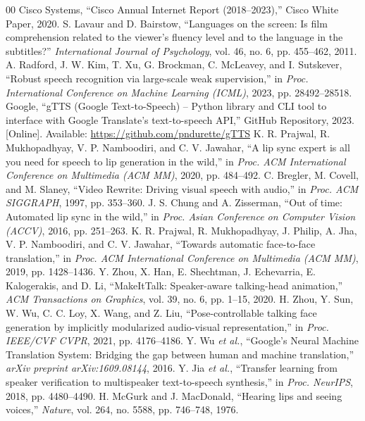 \documentclass[conference]{IEEEtran}
\begin{document}
\begin{thebibliography}{00}
 Cisco Systems, ``Cisco Annual Internet Report (2018--2023),'' Cisco White Paper, 2020.
 S. Lavaur and D. Bairstow, ``Languages on the screen: Is film comprehension related to the viewer's fluency level and to the language in the subtitles?'' \emph{International Journal of Psychology}, vol. 46, no. 6, pp. 455--462, 2011.
 A. Radford, J. W. Kim, T. Xu, G. Brockman, C. McLeavey, and I. Sutskever, ``Robust speech recognition via large-scale weak supervision,'' in \emph{Proc. International Conference on Machine Learning (ICML)}, 2023, pp. 28492--28518.
 Google, ``gTTS (Google Text-to-Speech) -- Python library and CLI tool to interface with Google Translate's text-to-speech API,'' GitHub Repository, 2023. [Online]. Available: \url{https://github.com/pndurette/gTTS}
 K. R. Prajwal, R. Mukhopadhyay, V. P. Namboodiri, and C. V. Jawahar, ``A lip sync expert is all you need for speech to lip generation in the wild,'' in \emph{Proc. ACM International Conference on Multimedia (ACM MM)}, 2020, pp. 484--492.
 C. Bregler, M. Covell, and M. Slaney, ``Video Rewrite: Driving visual speech with audio,'' in \emph{Proc. ACM SIGGRAPH}, 1997, pp. 353--360.
 J. S. Chung and A. Zisserman, ``Out of time: Automated lip sync in the wild,'' in \emph{Proc. Asian Conference on Computer Vision (ACCV)}, 2016, pp. 251--263.
 K. R. Prajwal, R. Mukhopadhyay, J. Philip, A. Jha, V. P. Namboodiri, and C. V. Jawahar, ``Towards automatic face-to-face translation,'' in \emph{Proc. ACM International Conference on Multimedia (ACM MM)}, 2019, pp. 1428--1436.
 Y. Zhou, X. Han, E. Shechtman, J. Echevarria, E. Kalogerakis, and D. Li, ``MakeItTalk: Speaker-aware talking-head animation,'' \emph{ACM Transactions on Graphics}, vol. 39, no. 6, pp. 1--15, 2020.
 H. Zhou, Y. Sun, W. Wu, C. C. Loy, X. Wang, and Z. Liu, ``Pose-controllable talking face generation by implicitly modularized audio-visual representation,'' in \emph{Proc. IEEE/CVF CVPR}, 2021, pp. 4176--4186.
 Y. Wu \emph{et al.}, ``Google's Neural Machine Translation System: Bridging the gap between human and machine translation,'' \emph{arXiv preprint arXiv:1609.08144}, 2016.
 Y. Jia \emph{et al.}, ``Transfer learning from speaker verification to multispeaker text-to-speech synthesis,'' in \emph{Proc. NeurIPS}, 2018, pp. 4480--4490.
 H. McGurk and J. MacDonald, ``Hearing lips and seeing voices,'' \emph{Nature}, vol. 264, no. 5588, pp. 746--748, 1976.
\end{thebibliography}
\end{document}
